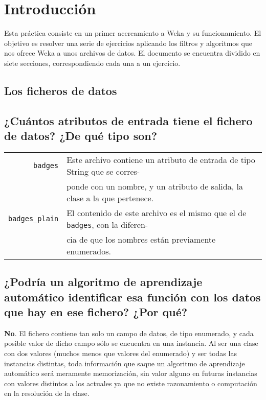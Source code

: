 \documentclass[12pt]{article}
\begin{document}
\tableofcontents

\newpage

\section*{Introducción}

Esta práctica consiste en un primer acercamiento a Weka y su funcionamiento. El objetivo es resolver una serie de ejercicios aplicando los filtros y algoritmos que nos ofrece Weka a unos archivos de datos. El documento se encuentra dividido en siete secciones, correspondiendo cada una a un ejercicio.

\begin{center}
\section{Los ficheros de datos}
\end{center}

\subsection*{\small ¿Cuántos atributos de entrada tiene el fichero de datos? ¿De qué tipo son?}

\begin{tabular}{rl}
  \texttt{badges} & Este archivo contiene un atributo de entrada de tipo String que se corres- \\ &ponde con un nombre, y un atributo de salida, la clase a la que pertenece.\\
  \texttt{badges\_plain} & El contenido de este archivo es el mismo que el de \texttt{badges}, con la diferen- \\ &cia de que los nombres están previamente enumerados.
\end{tabular}

\subsection*{\small ¿Podría un algoritmo de aprendizaje automático identificar
esa función con los datos que hay en ese fichero? ¿Por qué?}

\textbf{No}. El fichero contiene tan solo un campo de datos, de tipo enumerado, y cada posible valor de dicho campo sólo se encuentra en una instancia. Al ser una clase con dos valores (muchos menos que valores del enumerado) y ser todas las instancias distintas, toda información que saque un algoritmo de aprendizaje automático será meramente memorización, sin valor alguno en futuras instancias con valores distintos a los actuales ya que no existe razonamiento o computación en la resolución de la clase.
\end{document}
